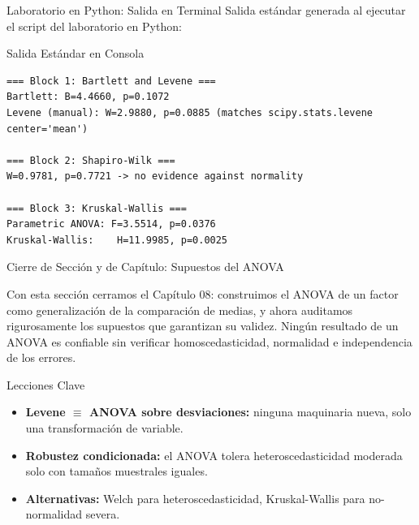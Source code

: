 \documentclass[10pt, aspectratio=169]{beamer}
\begin{document}
\begin{frame}[fragile]{Laboratorio en Python: Salida en Terminal}
  \scriptsize
  Salida estándar generada al ejecutar el script del laboratorio en Python:
  \vspace{0.02cm}
  \begin{block}{Salida Estándar en Consola}
    \fontsize{3.8pt}{4.6pt}\selectfont
    \begin{verbatim}
=== Block 1: Bartlett and Levene ===
Bartlett: B=4.4660, p=0.1072
Levene (manual): W=2.9880, p=0.0885 (matches scipy.stats.levene center='mean')

=== Block 2: Shapiro-Wilk ===
W=0.9781, p=0.7721 -> no evidence against normality

=== Block 3: Kruskal-Wallis ===
Parametric ANOVA: F=3.5514, p=0.0376
Kruskal-Wallis:    H=11.9985, p=0.0025
    \end{verbatim}
  \end{block}
\end{frame}

\begin{frame}{Cierre de Sección y de Capítulo: Supuestos del ANOVA}
  \begin{reflexion}
    Con esta sección cerramos el Capítulo 08: construimos el ANOVA de un factor como generalización de la comparación de medias, y ahora auditamos rigurosamente los supuestos que garantizan su validez. Ningún resultado de un ANOVA es confiable sin verificar homoscedasticidad, normalidad e independencia de los errores.
  \end{reflexion}

  \vspace{0.2cm}
  \pause
  \begin{block}{Lecciones Clave}
    \begin{itemize}\itemsep=0.08cm
      \item \textbf{Levene $\equiv$ ANOVA sobre desviaciones:} ninguna maquinaria nueva, solo una transformación de variable.
      \item \textbf{Robustez condicionada:} el ANOVA tolera heteroscedasticidad moderada solo con tamaños muestrales iguales.
      \item \textbf{Alternativas:} Welch para heteroscedasticidad, Kruskal-Wallis para no-normalidad severa.
    \end{itemize}
  \end{block}
\end{frame}
\end{document}
